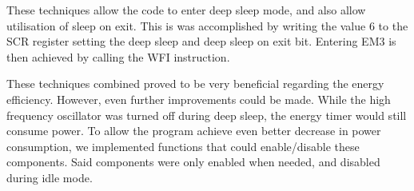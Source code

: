 These techniques allow the code to enter deep sleep mode, and also allow utilisation of sleep on exit. This is was accomplished by writing the value 6 to the SCR register setting the deep sleep and deep sleep on exit bit. Entering EM3 is then achieved by calling the WFI instruction.

These techniques combined proved to be very beneficial regarding the energy efficiency. However, even further improvements could be made. While the high frequency oscillator was turned off during deep sleep, the energy timer would still consume power. To allow the program achieve even better decrease in power consumption, we implemented functions that could enable/disable these components. Said components were only enabled when needed, and disabled during idle mode.